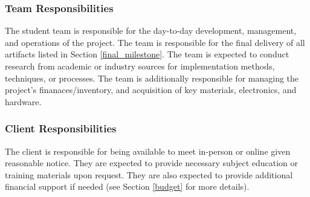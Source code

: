 \subsubsection{Team Responsibilities}
The student team is responsible for the day-to-day development, management, and
operations of the project. The
team is responsible for the final delivery of all artifacts listed in Section
\ref{final_milestone}.
The team is expected to conduct research from academic or industry sources
for implementation methods, techniques, or processes.
The team is additionally responsible for managing the project's finanaces/inventory,
and acquisition of key materials, electronics, and hardware.

\subsubsection{Client Responsibilities}
The client is responsible for being available to meet in-person or online
given reasonable notice. They are expected to provide necessary subject education or training materials upon request. They are also expected
to provide additional financial support if needed (see Section \ref{budget} for
more details).
